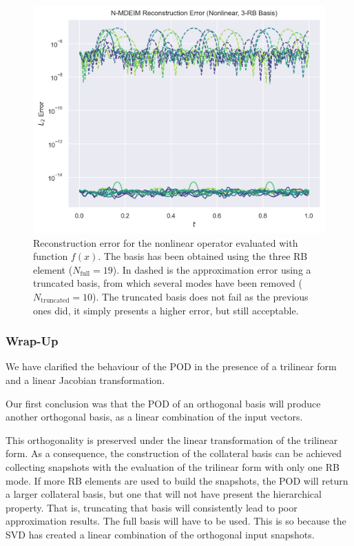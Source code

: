 \documentclass[../../thesis.tex]{subfiles}
\begin{document}
\begin{figure}[h]
    \includegraphics[width=\columnwidth]{research_project/piston/figures/svd_fourier/trilinear_nonlinear/rb_basis_mdeim_errors_nonlinear_num_3.png}
    \caption{Reconstruction error for the nonlinear operator evaluated with function $f(x)$.
    The basis has been obtained using the three RB element ($N_{\text{full}}=19$).
    In dashed is the approximation error using a truncated basis, 
    from which several modes have been removed ($N_{\text{truncated}}=10$). 
    The truncated basis does not fail as the previous ones did, it simply presents a higher error,
    but still acceptable.}
    \label{fig:appendix_rb_nonlinear_num_3}
\end{figure}

\subsubsection{Wrap-Up}
We have clarified the behaviour of the POD in the presence of a trilinear form 
and a linear Jacobian transformation.

Our first conclusion was that the POD of an orthogonal basis will produce
another orthogonal basis, as a linear combination of the input vectors.

This orthogonality is preserved under the linear transformation of the trilinear form.
As a consequence, the construction of the collateral basis can be achieved 
collecting snapshots with the evaluation of the trilinear form with 
only one RB mode.
If more RB elements are used to build the snapshots, 
the POD will return a larger collateral basis,
but one that will not have present the hierarchical property.
That is, truncating that basis will consistently lead to poor approximation results.
The full basis will have to be used.
This is so because the SVD has created a linear combination of the orthogonal input snapshots.
\end{document}
